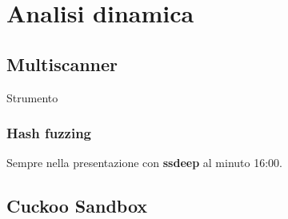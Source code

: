 \chapter{Analisi dinamica}

\section{Multiscanner}
Strumento \cite{anacondacon_multiscanner}

\subsection{Hash fuzzing}
Sempre nella presentazione \cite{anacondacon_multiscanner} con \textbf{ssdeep} al minuto 16:00.

\section{Cuckoo Sandbox}
